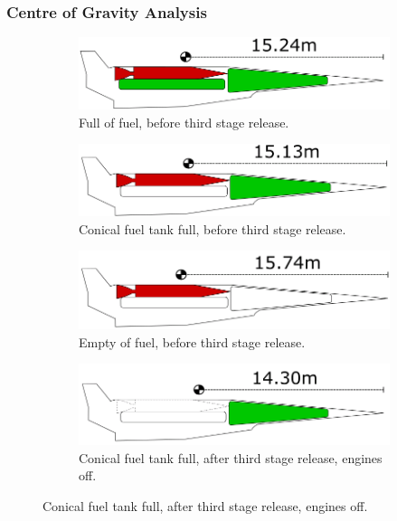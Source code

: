 		\subsubsection{Centre of Gravity Analysis}
		\begin{figure}
			\begin{subfigure}{.5\textwidth}
				\centering
				\includegraphics[width=0.9\linewidth]{figures/3_vehicle_design/CG1}
				\caption{Full of fuel, before third stage release.}
			\end{subfigure}
			\begin{subfigure}{.5\textwidth}
				\centering
				\includegraphics[width=0.9\linewidth]{figures/3_vehicle_design/CG2}
				\caption{Conical fuel tank full, before third stage release.}
				
			\end{subfigure}
			\begin{subfigure}{.5\textwidth}
				\centering
				\includegraphics[width=0.9\linewidth]{figures/3_vehicle_design/CG3}
				\caption{Empty of fuel, before third stage release.}
				
			\end{subfigure}
			\begin{subfigure}{.5\textwidth}
				\centering
				\includegraphics[width=0.9\linewidth]{figures/3_vehicle_design/CG4}
				\caption{Conical fuel tank full, after third stage release, engines off.}
				

\end{subfigure}
\end{figure}
